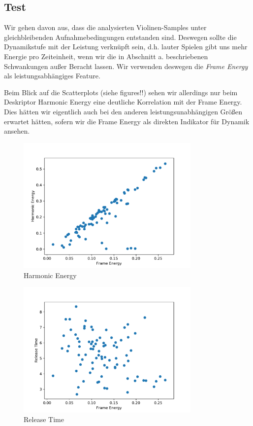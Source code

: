 \subsection{Test}
Wir gehen davon aus, dass die analysierten Violinen-Samples unter gleichbleibenden Aufnahmebedingungen entstanden sind. 
Deswegen sollte die Dynamikstufe mit der Leistung verknüpft sein, d.h. lauter Spielen gibt uns mehr Energie pro Zeiteinheit, wenn wir die in Abschnitt a. beschriebenen Schwankungen außer Beracht lassen.
Wir verwenden deswegen die \textit{Frame Energy} als leistungsabhängiges Feature.

Beim Blick auf die Scatterplots (siehe figures!!) sehen wir allerdings nur beim Deskriptor Harmonic Energy eine deutliche Korrelation mit der Frame Energy. 
Dies hätten wir eigentlich auch bei den anderen leistungsunabhängigen Größen erwartet hätten, sofern wir die Frame Energy als direkten Indikator für Dynamik ansehen.

\begin{figure}[H]
    \center
    \includegraphics[width = 0.8\textwidth]{Figures/harmonicErg}
    \caption{Harmonic Energy}
    \label{fig:im}
\end{figure}

\begin{figure}[H]
    \center
    \includegraphics[width = 0.8\textwidth]{Figures/rel.pdf}
    \caption{Release Time}
    \label{fig:im}
\end{figure}

